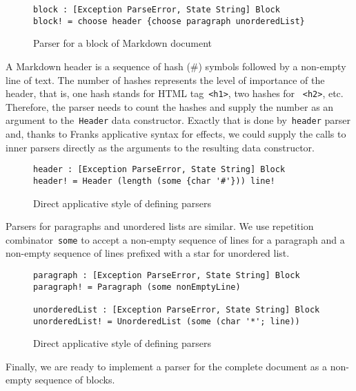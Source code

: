       \begin{figure}[h]
      \begin{lstlisting}
block : [Exception ParseError, State String] Block
block! = choose header {choose paragraph unorderedList}
      \end{lstlisting}
      \caption{Parser for a block of Markdown document}
      \label{listing:parserExprAppCombo}
      \end{figure}

      A Markdown header is a sequence of hash (\#) symbols followed by a
      non-empty line of text. The number of hashes represents the level of
      importance of the header, that is, one hash stands for HTML
      tag~\texttt{<h1>}, two hashes for ~\texttt{<h2>}, etc. Therefore, the parser
      needs to count the hashes and supply the number as an argument to the~\texttt{Header}
      data constructor. Exactly that is done by~\texttt{header} parser and, thanks to Franks
      applicative syntax for effects, we could supply the calls to inner parsers directly
      as the arguments to the resulting data constructor.

      \begin{figure}[h]
      \begin{lstlisting}
header : [Exception ParseError, State String] Block
header! = Header (length (some {char '#'})) line!
      \end{lstlisting}
      \caption{Direct applicative style of defining parsers}
      \label{listing:parserExprAppCombo}
      \end{figure}

      Parsers for paragraphs and unordered lists are similar. We use repetition
      combinator~\texttt{some} to accept a non-empty sequence of lines for a paragraph and
      a non-empty sequence of lines prefixed with a star for unordered list.

      \begin{figure}[h]
      \begin{lstlisting}
paragraph : [Exception ParseError, State String] Block
paragraph! = Paragraph (some nonEmptyLine)

unorderedList : [Exception ParseError, State String] Block
unorderedList! = UnorderedList (some (char '*'; line))
      \end{lstlisting}
      \caption{Direct applicative style of defining parsers}
      \label{listing:parserExprAppCombo}
      \end{figure}

      Finally, we are ready to implement a parser for the complete document as a
      non-empty sequence of blocks.

